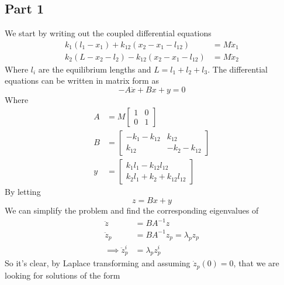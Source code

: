 \subsection{Part 1}
We start by writing out the coupled differential equations
\begin{equation}
    \begin{split}
        k_1(l_1-x_1) + k_{12}(x_2-x_1-l_{12})& = M\ddot{x}_1\\
        k_2(L-x_2-l_2)-k_{12}(x_2-x_1-l_{12})&=M\ddot{x}_2
    \end{split}
\end{equation}
Where $l_i$ are the equilibrium lengths and $L = l_1 + l_2 + l_3$. The differential equations can be written in matrix form as
\begin{equation}
    -A\ddot{x}+Bx+y=0
\end{equation}
Where
\begin{equation}
    \begin{split}
        A &= M \begin{bmatrix}
            1 & 0\\
            0 & 1
        \end{bmatrix}\\
        B & = \begin{bmatrix}
            -k_1 -k_{12} & k_{12}\\
            k_{12} & -k_2 -k_{12}
        \end{bmatrix}\\
        y &= \begin{bmatrix}
            k_1 l_1 - k_{12}l_{12}\\
            k_2l_1+k_2+k_{12}l_{12}
        \end{bmatrix}
    \end{split}
\end{equation}
By letting
\begin{equation}
    z = Bx+y
\end{equation}
We can simplify the problem and find the corresponding eigenvalues of
\begin{equation}
\begin{split}
    \ddot{z} &= BA^{-1}z\\
    \ddot{z}_p &= BA^{-1}z_p = \lambda_p z_p\\
    \implies \ddot{z}_p^i &= \lambda_p z_p^i
    \end{split}
\end{equation}
So it's clear, by Laplace transforming and assuming $\dot{z}_p(0) = 0$, that we are looking for solutions of the form
